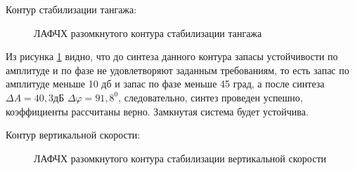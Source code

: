 \begin{center}
    Контур стабилизации тангажа:
\end{center}

\begin{figure}[H]
    \caption{ЛАФЧХ разомкнутого контура стабилизации тангажа}
    \label{fig:Тангаж раз qMIN}
\end{figure}

Из рисунка \ref{fig:Тангаж раз qMIN} видно, что до синтеза данного контура запасы устойчивости по амплитуде и по фазе не удовлетворяют заданным требованиям, то есть запас по амплитуде меньше 10 дб и запас по фазе меньше 45 град, а после синтеза $\Delta A = 40,3 $дБ $\Delta \varphi = 91,8^0$, следовательно, синтез проведен успешно, коэффициенты рассчитаны верно. Замкнутая система будет устойчива.  

\begin{center}
    Контур вертикальной скорости:
\end{center}

\begin{figure}[H]
    \caption{ЛАФЧХ разомкнутого контура стабилизации вертикальной скорости}
    \label{fig:Вертикальная скорость раз qMIN}
\end{figure}

